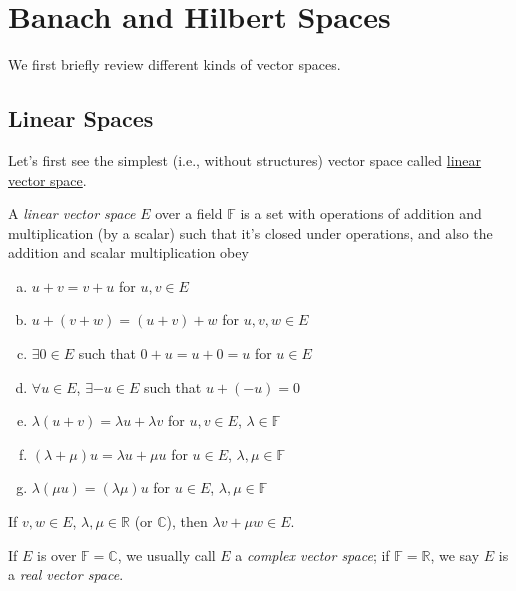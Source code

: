 \chapter{Banach and Hilbert Spaces}

We first briefly review different kinds of vector spaces.
\section{Linear Spaces}
Let's first see the simplest (i.e., without structures) vector space called \hyperref[def:linear-vector-space]{linear vector space}.
\begin{definition}\label{def:linear-vector-space}
	A \emph{linear vector space} \(E\) over a field \(\mathbb{F} \) is a set with operations of addition and multiplication (by a scalar) such that it's closed under operations, and also the addition and scalar multiplication obey
	\begin{enumerate}[(a)]
		\item \(u + v = v + u\) for \(u, v\in E\)
		\item \(u + (v + w) = (u + v) + w\) for \(u, v, w\in E\)
		\item \(\exists 0\in E\) such that \(0 + u = u + 0 = u\) for \(u\in E\)
		\item \(\forall u\in E\), \(\exists -u\in E\) such that \(u + (- u) = 0\)
		\item \(\lambda (u + v) = \lambda u + \lambda v\) for \(u, v\in E\), \(\lambda \in \mathbb{F} \)
		\item \((\lambda + \mu ) u = \lambda u + \mu u\) for \(u\in E\), \(\lambda , \mu \in \mathbb{F} \)
		\item \(\lambda (\mu u) = (\lambda \mu )u\) for \(u\in E\), \(\lambda , \mu \in \mathbb{F} \)
	\end{enumerate}
\end{definition}

\begin{remark}
	If \(v, w\in E\), \(\lambda , \mu \in \mathbb{R} \) (or \(\mathbb{C} \)), then \(\lambda v + \mu w\in E\).
\end{remark}

\begin{notation}
	If \(E\) is over \(\mathbb{F} = \mathbb{C} \), we usually call \(E\) a \emph{complex vector space}; if \(\mathbb{F} = \mathbb{R} \), we say \(E\) is a \emph{real vector space}.
\end{notation}

